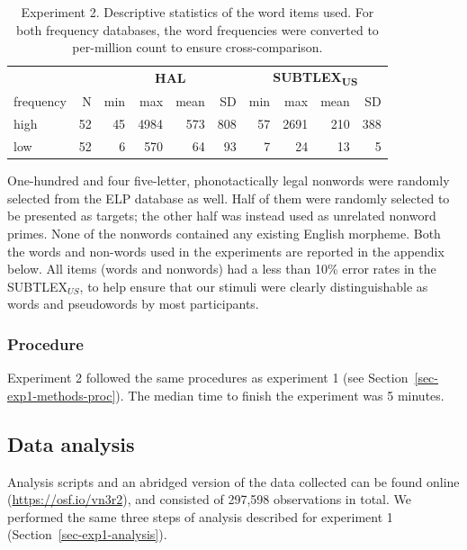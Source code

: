 \documentclass[
]{interact}
\begin{document}
\begin{longtable}{lrrrrrrrrr}

\caption{\label{tbl-words_exp2}Experiment 2. Descriptive statistics of
the word items used. For both frequency databases, the word frequencies
were converted to per-million count to ensure cross-comparison.}

\tabularnewline

\toprule
 &  & \multicolumn{4}{c}{\textbf{HAL}} & \multicolumn{4}{c}{\textbf{SUBTLEX\textsubscript{US}}} \\ 
\cmidrule(lr){3-6} \cmidrule(lr){7-10}
frequency & N & min & max & mean & SD & min & max & mean & SD \\ 
\midrule\addlinespace[2.5pt]
high & 52 & 45 & 4984 & 573 & 808 & 57 & 2691 & 210 & 388 \\ 
low & 52 & 6 & 570 & 64 & 93 & 7 & 24 & 13 & 5 \\ 
\bottomrule

\end{longtable}

One-hundred and four five-letter, phonotactically legal nonwords were
randomly selected from the ELP database as well. Half of them were
randomly selected to be presented as targets; the other half was instead
used as unrelated nonword primes. None of the nonwords contained any
existing English morpheme. Both the words and non-words used in the
experiments are reported in the appendix below. All items (words and
nonwords) had a less than 10\% error rates in the SUBTLEX\(_{US}\), to
help ensure that our stimuli were clearly distinguishable as words and
pseudowords by most participants.

\subsubsection{Procedure}\label{sec-exp2-methods-proc}

Experiment 2 followed the same procedures as experiment 1 (see
Section~\ref{sec-exp1-methods-proc}). The median time to finish the
experiment was 5 minutes.

\subsection{Data analysis}\label{sec-exp2-analysis}

Analysis scripts and an abridged version of the data collected can be
found online (\url{https://osf.io/vn3r2}), and consisted of 297,598
observations in total. We performed the same three steps of analysis
described for experiment 1 (Section~\ref{sec-exp1-analysis}).
\end{document}
